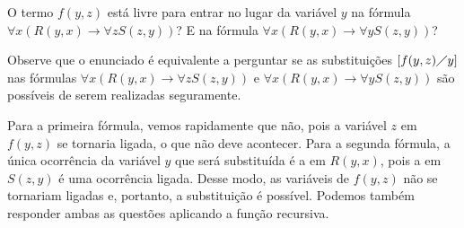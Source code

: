 \begin{rexercises}
    \begin{question}
        O termo $f(y,z)$ está livre para entrar no lugar da variável $y$ na fórmula\\ $\forall x(R(y, x) \rightarrow \forall z S(z, y))$? E na fórmula $\forall x(R(y, x) \rightarrow \forall y S(z, y))$?
        \begin{resolution}
            Observe que o enunciado é equivalente a perguntar se as substituições $[f(y,z)\diagup y]$ nas fórmulas $\forall x(R(y, x) \rightarrow \forall z S(z, y))$ e $\forall x(R(y, x) \rightarrow \forall y S(z, y))$ são possíveis de serem realizadas seguramente. 
            
            Para a primeira fórmula, vemos rapidamente que não, pois a variável $z$ em $f(y,z)$ se tornaria ligada, o que não deve acontecer. Para a segunda fórmula, a única ocorrência da variável $y$ que será substituída é a em $R(y,x)$, pois a em $S(z,y)$ é uma ocorrência ligada. Desse modo, as variáveis de $f(y,z)$ não se tornariam ligadas e, portanto, a substituição é possível.
            Podemos também responder ambas as questões aplicando a função recursiva.
        \end{resolution}
    \end{question}
\end{rexercises}


